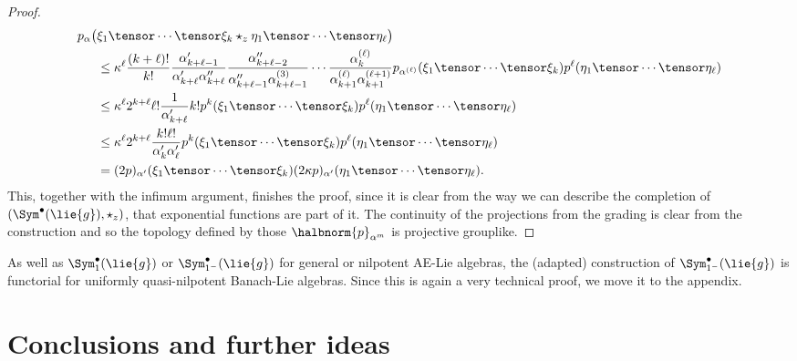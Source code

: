\documentclass[
11pt,                          %
english                        %
]{article}
\begin{document}
\begin{proof}
\begin{align*}
		p_\alpha \big(
		&
			\xi_1 \tensor \cdots \tensor \xi_k
			\star_z
			\eta_1 \tensor \cdots \tensor \eta_\ell
		\big)
		\\
		& \leq
		\kappa^\ell
		\frac{(k + \ell)!}{k!}
		\frac{\alpha_{k + \ell - 1}'}{\alpha_{k + \ell}' \alpha_{k+\ell}''}
		\frac{\alpha_{k + \ell - 2}''}
		{\alpha_{k + \ell - 1}'' \alpha_{k+\ell-1}^{(3)}}
		\cdots
		\frac{\alpha_{k}^{(\ell)}}
		{\alpha_{k + 1}^{(\ell)} \alpha_{k+1}^{(\ell + 1)}}
		p_{\alpha^{(\ell)}} (\xi_1 \tensor \cdots \tensor \xi_k)
		p^\ell ( \eta_1 \tensor \cdots \tensor \eta_\ell )
		\\
		& \leq
		\kappa^\ell
		2^{k + \ell}
		\ell!
		\frac{1}{\alpha_{k + \ell}'}
		k!
		p^k (\xi_1 \tensor \cdots \tensor \xi_k)
		p^\ell ( \eta_1 \tensor \cdots \tensor \eta_\ell )
		\\
		& \leq
		\kappa^\ell
		2^{k + \ell}
		\frac{k! \ell!}{\alpha_k' \alpha_\ell '}
		p^k (\xi_1 \tensor \cdots \tensor \xi_k)
		p^\ell ( \eta_1 \tensor \cdots \tensor \eta_\ell )
		\\
		&=
		(2p)_{\alpha'} (\xi_1 \tensor \cdots \tensor \xi_k)
		(2 \kappa p)_{\alpha'} ( \eta_1 \tensor \cdots \tensor \eta_\ell ).
	\end{align*}
	This, together with the infimum argument, finishes the proof, since it is clear 
	from the way we can describe the completion of $\left( \Sym^{\bullet}(\lie{g}), 
	\star_z \right)$, that exponential functions are part of it. The continuity of 
	the projections from the grading is clear from the construction and so the 
	topology defined by those $\halbnorm{p}_{\alpha^{m}}$ is projective grouplike.
\end{proof}
As well as $\Sym_1^{\bullet}(\lie{g})$ or $\Sym_{1^-}^{\bullet}(\lie{g})$ for general 
or nilpotent AE-Lie algebras, the (adapted) construction of $\Sym_{1^-}^{\bullet}
(\lie{g})$ is functorial for uniformly quasi-nilpotent Banach-Lie algebras. Since 
this is again a very technical proof, we move it to the appendix.


\section{Conclusions and further ideas}
\end{document}

